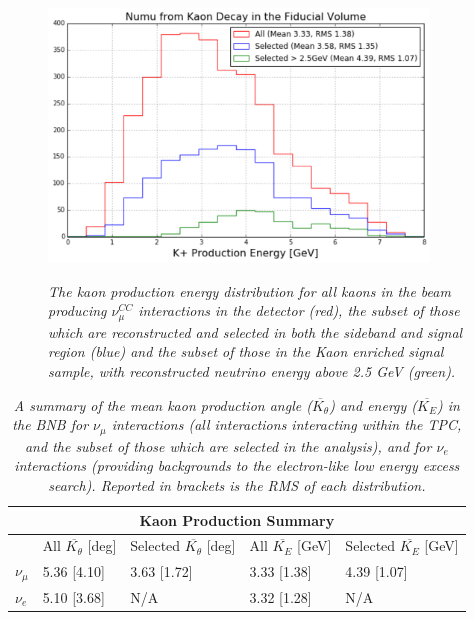 \begin{figure}[ht!]
\centering
	\includegraphics[width=0.9\textwidth]{Figures/kaon_energy_selection.png} \\
\caption{\textit{The kaon production energy distribution for all kaons in the beam producing $\nu_\mu^{CC}$ interactions in the detector (red), the subset of those which are reconstructed and selected in both the sideband and signal region (blue) and the subset of those in the Kaon enriched signal sample, with reconstructed neutrino energy above 2.5 GeV (green).}}\label{kaon_energy_selection}
\end{figure}


\begin{table}
\begin{tabular}{ |p{0.5cm}|p{2.5cm}|p{4cm}|p{3cm}|p{3.5cm}|  }
 \hline
 \multicolumn{5}{|c|}{Kaon Production Summary} \\
 \hline
   & All $\overline{K_\theta}$ [deg] & Selected $\overline{K_\theta}$ [deg] & All $\overline{K_E}$ [GeV] & Selected $\overline{K_E}$ [GeV]\\
 \hline \hline
 $\nu_\mu$ & 5.36 [4.10] & 3.63 [1.72] & 3.33 [1.38] & 4.39 [1.07] \\\hline
 $\nu_e$ & 5.10 [3.68] & N/A & 3.32 [1.28] & N/A \\\hline
 \hline
\end{tabular}
\caption{\textit{A summary of the mean kaon production angle ($\overline{K_\theta}$) and energy ($\overline{K_E}$) in the BNB for $\nu_\mu$ interactions (all interactions interacting within the TPC, and the subset of those which are selected in the analysis), and for $\nu_e$ interactions (providing backgrounds to the electron-like low energy excess search). Reported in brackets is the RMS of each distribution.}}\label{kaon_energy_angle_table}
\end{table}


















